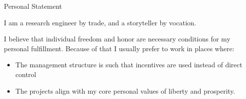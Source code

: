 \begin{rubric}{Personal Statement}{

\prefix{}

\entry*

I am a research engineer by trade, and a storyteller by vocation.

I believe that individual freedom and honor are necessary conditions
for my personal fulfillment. Because of that I usually prefer to work
in places where:

\begin{itemize}
\item The management structure is such that incentives are used
instead of direct control
\item The projects align with my core personal values of liberty and
prosperity.
\end{itemize}

}
\end{rubric}

